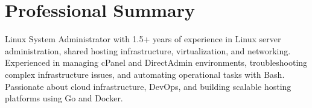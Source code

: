 \section{Professional Summary}

Linux System Administrator with 1.5+ years of experience in Linux server administration, shared hosting infrastructure, virtualization, and networking. Experienced in managing cPanel and DirectAdmin environments, troubleshooting complex infrastructure issues, and automating operational tasks with Bash. Passionate about cloud infrastructure, DevOps, and building scalable hosting platforms using Go and Docker.